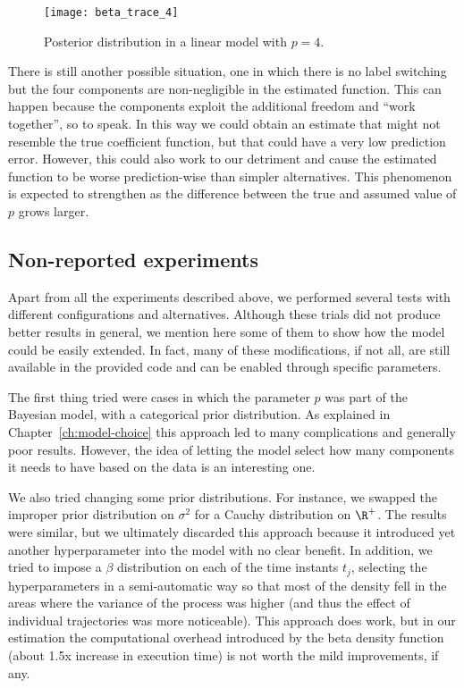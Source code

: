 \begin{figure}[ht!]
  \centering
  \texttt{[image: beta\_trace\_4]}
  \caption{Posterior distribution in a linear model with \(p=4\).}\label{fig:beta_trace_4}
\end{figure}

There is still another possible situation, one in which there is no label switching but the four components are non-negligible in the estimated function. This can happen because the components exploit the additional freedom and ``work together'', so to speak. In this way we could obtain an estimate that might not resemble the true coefficient function, but that could have a very low prediction error. However, this could also work to our detriment and cause the estimated function to be worse prediction-wise than simpler alternatives. This phenomenon is expected to strengthen as the difference between the true and assumed value of \(p\) grows larger.



\subsection*{Non-reported experiments}

Apart from all the experiments described above, we performed several tests with different configurations and alternatives. Although these trials did not produce better results in general, we mention here some of them to show how the model could be easily extended. In fact, many of these modifications, if not all, are still available in the provided code and can be enabled through specific parameters.

The first thing tried were cases in which the parameter \(p\) was part of the Bayesian model, with a categorical prior distribution. As explained in Chapter~\ref{ch:model-choice} this approach led to many complications and generally poor results. However, the idea of letting the model select how many components it needs to have based on the data is an interesting one.

We also tried changing some prior distributions. For instance, we swapped the improper prior distribution on \(\sigma^2\) for a Cauchy distribution on \(\R^+\). The results were similar, but we ultimately discarded this approach because it introduced yet another hyperparameter into the model with no clear benefit. In addition, we tried to impose a \(\beta\) distribution on each of the time instants \(t_j\), selecting the hyperparameters in a semi-automatic way so that most of the density fell in the areas where the variance of the process was higher (and thus the effect of individual trajectories was more noticeable). This approach does work, but in our estimation the computational overhead introduced by the beta density function (about 1.5x increase in execution time) is not worth the mild improvements, if any.

